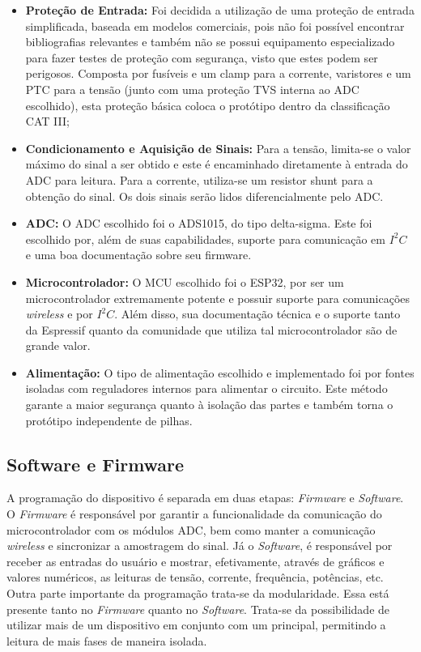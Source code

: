 \begin{itemize}
    \item \textbf{Proteção de Entrada:} Foi decidida a utilização de uma proteção de entrada simplificada, baseada em modelos comerciais, pois não foi possível encontrar bibliografias relevantes e também não se possui equipamento especializado para fazer testes de proteção com segurança, visto que estes podem ser perigosos. Composta por fusíveis e um clamp para a corrente, varistores e um PTC para a tensão (junto com uma proteção TVS interna ao ADC escolhido), esta proteção básica coloca o protótipo dentro da classificação CAT III;
    \item \textbf{Condicionamento e Aquisição de Sinais:} Para a tensão, limita-se o valor máximo do sinal a ser obtido e este é encaminhado diretamente à entrada do ADC para leitura. Para a corrente, utiliza-se um resistor shunt para a obtenção do sinal. Os dois sinais serão lidos diferencialmente pelo ADC.
    \item \textbf{ADC:} O ADC escolhido foi o ADS1015, do tipo delta-sigma. Este foi escolhido por, além de suas capabilidades, suporte para comunicação em $I^2C$ e uma boa documentação sobre seu firmware.
    \item \textbf{Microcontrolador:} O MCU escolhido foi o ESP32, por ser um microcontrolador extremamente potente e possuir suporte para comunicações \textit{wireless} e por $I^2C$. Além disso, sua documentação técnica e o suporte tanto da Espressif quanto da comunidade que utiliza tal microcontrolador são de grande valor.
    \item \textbf{Alimentação:} O tipo de alimentação escolhido e implementado foi por fontes isoladas com reguladores internos para alimentar o circuito. Este método garante a maior segurança quanto à isolação das partes e também torna o protótipo independente de pilhas.
\end{itemize}

\subsection{Software e Firmware}\label{softfirm}

A programação do dispositivo é separada em duas etapas: \textit{Firmware} e \textit{Software}. O \textit{Firmware} é responsável por garantir a funcionalidade da comunicação do microcontrolador com os módulos \gls{ADC}, bem como manter a comunicação \textit{wireless} e sincronizar a amostragem do sinal.
Já o \textit{Software}, é responsável por receber as entradas do usuário e mostrar, efetivamente, através de gráficos e valores numéricos, as leituras de tensão, corrente, frequência, potências, etc.
Outra parte importante da programação trata-se da modularidade. Essa está presente tanto no \textit{Firmware} quanto no \textit{Software}. Trata-se da possibilidade de utilizar mais de um dispositivo em conjunto com um principal, permitindo a leitura de mais fases de maneira isolada.

